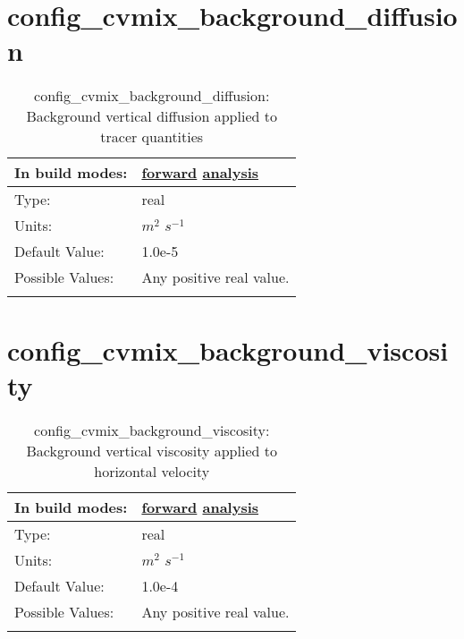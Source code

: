 \section[config\_cvmix\_background\_diffusion]{config\_cvmix\_background\_diffusion}
\label{sec:nm_sec_config_cvmix_background_diffusion}
\begin{center}
\begin{longtable}{| p{2.0in} || p{4.0in} |}
    \hline
    In build modes: & \hyperref[subsec:forward_nm_tab_cvmix]{forward} \hyperref[subsec:analysis_nm_tab_cvmix]{analysis} \\
    \hline
    Type: & real \\
    \hline
    Units: & $m^2$ $s^{-1}$ \\
    \hline
    Default Value: & 1.0e-5 \\
    \hline
    Possible Values: & Any positive real value. \\
    \hline
    \caption{config\_cvmix\_background\_diffusion: Background vertical diffusion applied to tracer quantities}
\end{longtable}
\end{center}
\section[config\_cvmix\_background\_viscosity]{config\_cvmix\_background\_viscosity}
\label{sec:nm_sec_config_cvmix_background_viscosity}
\begin{center}
\begin{longtable}{| p{2.0in} || p{4.0in} |}
    \hline
    In build modes: & \hyperref[subsec:forward_nm_tab_cvmix]{forward} \hyperref[subsec:analysis_nm_tab_cvmix]{analysis} \\
    \hline
    Type: & real \\
    \hline
    Units: & $m^2$ $s^{-1}$ \\
    \hline
    Default Value: & 1.0e-4 \\
    \hline
    Possible Values: & Any positive real value. \\
    \hline
    \caption{config\_cvmix\_background\_viscosity: Background vertical viscosity applied to horizontal velocity}
\end{longtable}
\end{center}
